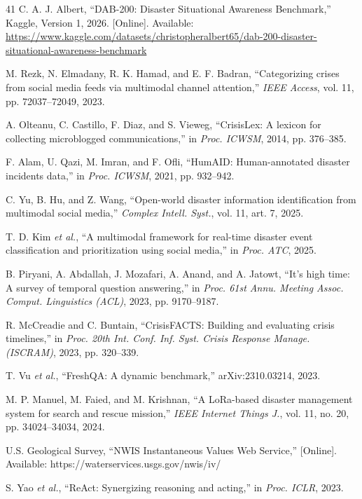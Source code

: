 \documentclass[conference]{IEEEtran}
\begin{document}
\begin{thebibliography}{41}
C. A. J. Albert,
``DAB-200: Disaster Situational Awareness Benchmark,''
Kaggle, Version 1, 2026. [Online]. Available:
\url{https://www.kaggle.com/datasets/christopheralbert65/dab-200-disaster-situational-awareness-benchmark}

 M. Rezk, N. Elmadany, R. K. Hamad, and E. F. Badran, ``Categorizing crises from social media feeds via multimodal channel attention,'' \textit{IEEE Access}, vol. 11, pp. 72037--72049, 2023.

 A. Olteanu, C. Castillo, F. Diaz, and S. Vieweg, ``CrisisLex: A lexicon for collecting microblogged communications,'' in \textit{Proc. ICWSM}, 2014, pp. 376--385.

 F. Alam, U. Qazi, M. Imran, and F. Ofli, ``HumAID: Human-annotated disaster incidents data,'' in \textit{Proc. ICWSM}, 2021, pp. 932--942.

 C. Yu, B. Hu, and Z. Wang, ``Open-world disaster information identification from multimodal social media,'' \textit{Complex Intell. Syst.}, vol. 11, art. 7, 2025.

 T. D. Kim \textit{et al.}, ``A multimodal framework for real-time disaster event classification and prioritization using social media,'' in \textit{Proc. ATC}, 2025.

 B. Piryani, A. Abdallah, J. Mozafari, A. Anand, and A. Jatowt, ``It's high time: A survey of temporal question answering,'' in \textit{Proc. 61st Annu. Meeting Assoc. Comput. Linguistics (ACL)}, 2023, pp. 9170--9187.

 R. McCreadie and C. Buntain, ``CrisisFACTS: Building and evaluating crisis timelines,'' in \textit{Proc. 20th Int. Conf. Inf. Syst. Crisis Response Manage. (ISCRAM)}, 2023, pp. 320--339.

 T. Vu \textit{et al.}, ``FreshQA: A dynamic benchmark,'' arXiv:2310.03214, 2023.

 M. P. Manuel, M. Faied, and M. Krishnan, ``A LoRa-based disaster management system for search and rescue mission,'' \textit{IEEE Internet Things J.}, vol. 11, no. 20, pp. 34024--34034, 2024.

 U.S. Geological Survey, ``NWIS Instantaneous Values Web Service,'' [Online]. Available: https://waterservices.usgs.gov/nwis/iv/

 S. Yao \textit{et al.}, ``ReAct: Synergizing reasoning and acting,'' in \textit{Proc. ICLR}, 2023.


\end{thebibliography}
\end{document}
